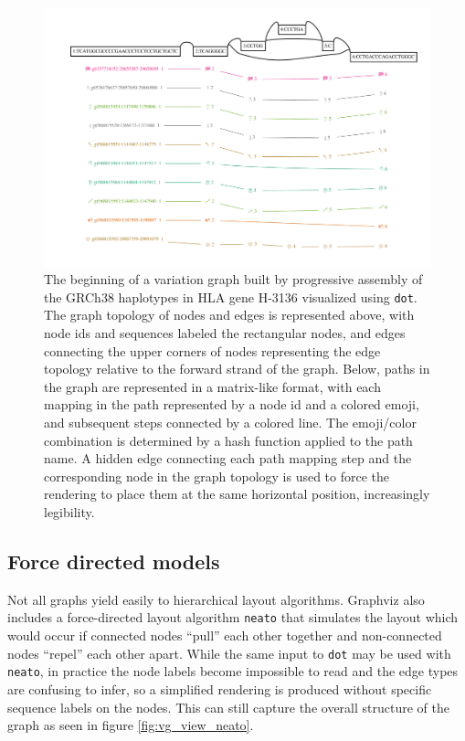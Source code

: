 \begin{figure}[htbp!] 
\centering    
\includegraphics[width=1.0\textwidth]{Chapter2/Figs/vg_view_dp_H-3136_dot.pdf}
\caption[Hierarchical visualization with Graphviz's {\tt dot}]{The beginning of a variation graph built by progressive assembly of the GRCh38 haplotypes in HLA gene H-3136 visualized using {\tt dot}.
  The graph topology of nodes and edges is represented above, with node ids and sequences labeled the rectangular nodes, and edges connecting the upper corners of nodes representing the edge topology relative to the forward strand of the graph.
  Below, paths in the graph are represented in a matrix-like format, with each mapping in the path represented by a node id and a colored emoji, and subsequent steps connected by a colored line.
  The emoji/color combination is determined by a hash function applied to the path name.
  A hidden edge connecting each path mapping step and the corresponding node in the graph topology is used to force the rendering to place them at the same horizontal position, increasingly legibility.
}
\label{fig:vg_view_dot}
\end{figure}

\subsection{Force directed models}

Not all graphs yield easily to hierarchical layout algorithms.
Graphviz also includes a force-directed layout algorithm {\tt neato} that simulates the layout which would occur if connected nodes ``pull'' each other together and non-connected nodes ``repel'' each other apart.
While the same input to {\tt dot} may be used with {\tt neato}, in practice the node labels become impossible to read and the edge types are confusing to infer, so a simplified rendering is produced without specific sequence labels on the nodes.
This can still capture the overall structure of the graph as seen in figure \ref{fig:vg_view_neato}.

